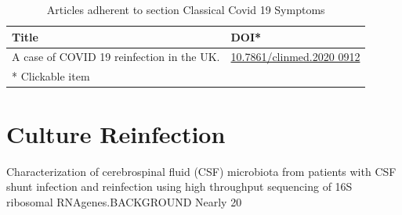 \documentclass{qqtarticle}
\begin{document}
    \begin{table}[H]
    \scriptsize
    \centering
    \caption{Articles adherent to section Classical Covid 19 Symptoms}
    \renewcommand{\arraystretch}{1.5}
    \begin{tabular}{p{}l}
        \toprule 
        Title & DOI* \\     \midrule A case of COVID 19 reinfection in the UK. \cite{Acaseofd09299c3} & \href{https://dx.doi.org/10.7861/clinmed.2020 0912}{10.7861/clinmed.2020 0912}\\     \midrule
        * Clickable item \\
        \bottomrule
    \end{tabular}
    \label{tab:topic2}
    \end{table}\section{Culture Reinfection}
        Characterization of cerebrospinal fluid (CSF) microbiota from patients with CSF shunt infection and reinfection using high throughput sequencing of 16S ribosomal RNAgenes.BACKGROUND  Nearly 20%
\end{document}
